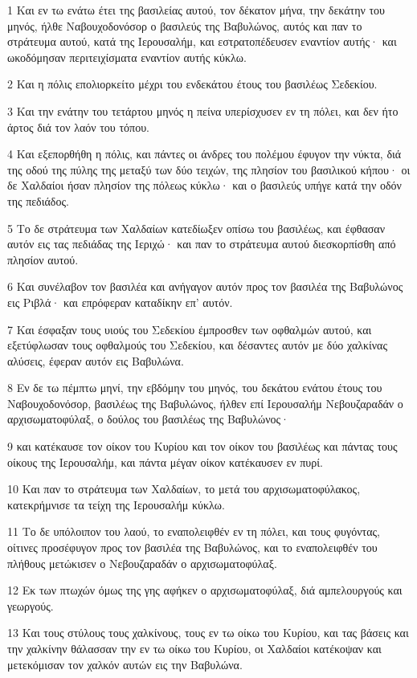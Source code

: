 \par 1 Και εν τω ενάτω έτει της βασιλείας αυτού, τον δέκατον μήνα, την δεκάτην του μηνός, ήλθε Ναβουχοδονόσορ ο βασιλεύς της Βαβυλώνος, αυτός και παν το στράτευμα αυτού, κατά της Ιερουσαλήμ, και εστρατοπέδευσεν εναντίον αυτής· και ωκοδόμησαν περιτειχίσματα εναντίον αυτής κύκλω.
\par 2 Και η πόλις επολιορκείτο μέχρι του ενδεκάτου έτους του βασιλέως Σεδεκίου.
\par 3 Και την ενάτην του τετάρτου μηνός η πείνα υπερίσχυσεν εν τη πόλει, και δεν ήτο άρτος διά τον λαόν του τόπου.
\par 4 Και εξεπορθήθη η πόλις, και πάντες οι άνδρες του πολέμου έφυγον την νύκτα, διά της οδού της πύλης της μεταξύ των δύο τειχών, της πλησίον του βασιλικού κήπου· οι δε Χαλδαίοι ήσαν πλησίον της πόλεως κύκλω· και ο βασιλεύς υπήγε κατά την οδόν της πεδιάδος.
\par 5 Το δε στράτευμα των Χαλδαίων κατεδίωξεν οπίσω του βασιλέως, και έφθασαν αυτόν εις τας πεδιάδας της Ιεριχώ· και παν το στράτευμα αυτού διεσκορπίσθη από πλησίον αυτού.
\par 6 Και συνέλαβον τον βασιλέα και ανήγαγον αυτόν προς τον βασιλέα της Βαβυλώνος εις Ριβλά· και επρόφεραν καταδίκην επ' αυτόν.
\par 7 Και έσφαξαν τους υιούς του Σεδεκίου έμπροσθεν των οφθαλμών αυτού, και εξετύφλωσαν τους οφθαλμούς του Σεδεκίου, και δέσαντες αυτόν με δύο χαλκίνας αλύσεις, έφεραν αυτόν εις Βαβυλώνα.
\par 8 Εν δε τω πέμπτω μηνί, την εβδόμην του μηνός, του δεκάτου ενάτου έτους του Ναβουχοδονόσορ, βασιλέως της Βαβυλώνος, ήλθεν επί Ιερουσαλήμ Νεβουζαραδάν ο αρχισωματοφύλαξ, ο δούλος του βασιλέως της Βαβυλώνος·
\par 9 και κατέκαυσε τον οίκον του Κυρίου και τον οίκον του βασιλέως και πάντας τους οίκους της Ιερουσαλήμ, και πάντα μέγαν οίκον κατέκαυσεν εν πυρί.
\par 10 Και παν το στράτευμα των Χαλδαίων, το μετά του αρχισωματοφύλακος, κατεκρήμνισε τα τείχη της Ιερουσαλήμ κύκλω.
\par 11 Το δε υπόλοιπον του λαού, το εναπολειφθέν εν τη πόλει, και τους φυγόντας, οίτινες προσέφυγον προς τον βασιλέα της Βαβυλώνος, και το εναπολειφθέν του πλήθους μετώκισεν ο Νεβουζαραδάν ο αρχισωματοφύλαξ.
\par 12 Εκ των πτωχών όμως της γης αφήκεν ο αρχισωματοφύλαξ, διά αμπελουργούς και γεωργούς.
\par 13 Και τους στύλους τους χαλκίνους, τους εν τω οίκω του Κυρίου, και τας βάσεις και την χαλκίνην θάλασσαν την εν τω οίκω του Κυρίου, οι Χαλδαίοι κατέκοψαν και μετεκόμισαν τον χαλκόν αυτών εις την Βαβυλώνα.
